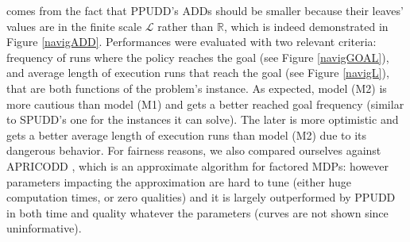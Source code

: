 comes from the fact that PPUDD's ADDs should be smaller because their leaves'
values are in the finite scale $\mathcal{L}$ rather than $\mathbb{R}$, which is indeed
demonstrated in Figure \ref{navigADD}. Performances were evaluated 
with two relevant criteria: frequency of runs where 
the policy reaches the goal (see Figure \ref{navigGOAL}), and
average length of execution runs that reach the goal (see Figure \ref{navigL}), 
that are both functions of the problem's instance.
As expected, model (M2) is more cautious than model (M1) and gets a better 
reached goal frequency  (similar to SPUDD's one for the instances it can solve). 
The later is more optimistic and gets a better average length of execution runs than model (M2) due to
its dangerous behavior. For fairness reasons, we also compared ourselves against 
APRICODD \cite{St-aubin00apricodd:approximate}, 
which is an approximate algorithm for factored MDPs: however parameters impacting the approximation
are hard to tune (either huge computation times, or zero qualities) and it is
largely outperformed by PPUDD in both time and quality whatever the parameters %
(curves are not shown since uninformative).\\

